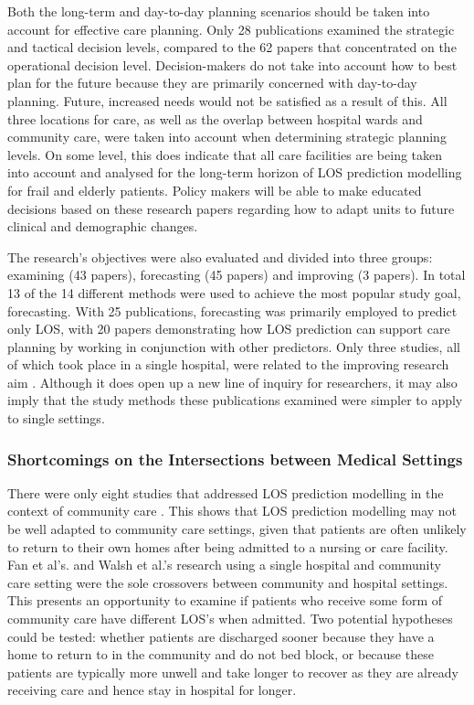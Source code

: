 \documentclass[../thesis.tex]{subfiles}
\begin{document}
Both the long-term and day-to-day planning scenarios should be taken into account for effective care planning. Only 28 publications examined the strategic and tactical decision levels, compared to the 62 papers that concentrated on the operational decision level. Decision-makers do not take into account how to best plan for the future because they are primarily concerned with day-to-day planning. Future, increased needs would not be satisfied as a result of this. All three locations for care, as well as the overlap between hospital wards and community care, were taken into account when determining strategic planning levels. On some level, this does indicate that all care facilities are being taken into account and analysed for the long-term horizon of LOS prediction modelling for frail and elderly patients. Policy makers will be able to make educated decisions based on these research papers regarding how to adapt units to future clinical and demographic changes.

The research's objectives were also evaluated and divided into three groups: examining (43 papers), forecasting (45 papers) and improving (3 papers). In total 13 of the 14 different methods were used to achieve the most popular study goal, forecasting. With 25 publications, forecasting was primarily employed to predict only LOS, with 20 papers demonstrating how LOS prediction can support care planning by working in conjunction with other predictors. Only three studies, all of which took place in a single hospital, were related to the improving research aim \cite{Hamdani,Basic2015,Walsh2020}. Although it does open up a new line of inquiry for researchers, it may also imply that the study methods these publications examined were simpler to apply to single settings.

\subsubsection{Shortcomings on the Intersections between Medical Settings}

There were only eight studies that addressed LOS prediction modelling in the context of community care \cite{Cai2009,Fan2021,Gordon2,Hoben2019,Johnson2011,Park2012,Walsh2020,Welberry}. This shows that LOS prediction modelling may not be well adapted to community care settings, given that patients are often unlikely to return to their own homes after being admitted to a nursing or care facility. Fan et al's. \cite{Fan2021} and Walsh et al.'s \cite{Walsh2020} research using a single hospital and community care setting were the sole crossovers between community and hospital settings. This presents an opportunity to examine if patients who receive some form of community care have different LOS's when admitted. Two potential hypotheses could be tested: whether patients are discharged sooner because they have a home to return to in the community and do not bed block, or because these patients are typically more unwell and take longer to recover as they are already receiving care and hence stay in hospital for longer.
\end{document}
